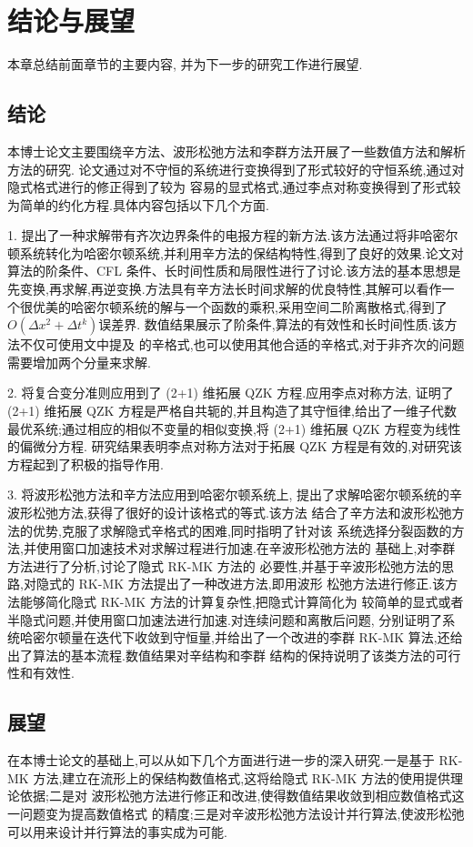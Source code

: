 \chapter{结论与展望}
本章总结前面章节的主要内容, 并为下一步的研究工作进行展望.
\section{结论}
本博士论文主要围绕辛方法、波形松弛方法和李群方法开展了一些数值方法和解析方法的研究.
论文通过对不守恒的系统进行变换得到了形式较好的守恒系统,通过对隐式格式进行的修正得到了较为
容易的显式格式,通过李点对称变换得到了形式较为简单的约化方程.具体内容包括以下几个方面.

1. 提出了一种求解带有齐次边界条件的电报方程的新方法.该方法通过将非哈密尔顿系统转化为哈密尔顿系统,并利用辛方法的保结构特性,得到了良好的效果.论文对算法的阶条件、CFL 条件、长时间性质和局限性进行了讨论.该方法的基本思想是先变换,再求解,再逆变换.方法具有辛方法长时间求解的优良特性,其解可以看作一个很优美的哈密尔顿系统的解与一个函数的乘积,采用空间二阶离散格式,得到了 \texorpdfstring{$O(\Delta x^2+ \Delta t^k)$} 的误差界.
数值结果展示了阶条件,算法的有效性和长时间性质.该方法不仅可使用文中提及
的辛格式,也可以使用其他合适的辛格式,对于非齐次的问题需要增加两个分量来求解.

2. 将复合变分准则应用到了 (2+1) 维拓展 QZK 方程.应用李点对称方法,
证明了 (2+1) 维拓展 QZK 方程是严格自共轭的,并且构造了其守恒律,给出了一维子代数
最优系统;通过相应的相似不变量的相似变换,将 (2+1) 维拓展 QZK 方程变为线性的偏微分方程.
研究结果表明李点对称方法对于拓展 QZK 方程是有效的,对研究该方程起到了积极的指导作用.

3. 将波形松弛方法和辛方法应用到哈密尔顿系统上,
提出了求解哈密尔顿系统的辛波形松弛方法,获得了很好的设计该格式的等式.该方法
结合了辛方法和波形松弛方法的优势,克服了求解隐式辛格式的困难,同时指明了针对该
系统选择分裂函数的方法,并使用窗口加速技术对求解过程进行加速.在辛波形松弛方法的
基础上,对李群方法进行了分析,讨论了隐式 RK-MK 方法的
必要性,并基于辛波形松弛方法的思路,对隐式的 RK-MK 方法提出了一种改进方法,即用波形
松弛方法进行修正.该方法能够简化隐式 RK-MK 方法的计算复杂性,把隐式计算简化为
较简单的显式或者半隐式问题,并使用窗口加速法进行加速.对连续问题和离散后问题,
分别证明了系统哈密尔顿量在迭代下收敛到守恒量,并给出了一个改进的李群 RK-MK
算法,还给出了算法的基本流程.数值结果对辛结构和李群
结构的保持说明了该类方法的可行性和有效性.

\section{展望}
在本博士论文的基础上,可以从如下几个方面进行进一步的深入研究.一是基于 RK-MK
方法,建立在流形上的保结构数值格式,这将给隐式 RK-MK 方法的使用提供理论依据;二是对
波形松弛方法进行修正和改进,使得数值结果收敛到相应数值格式这一问题变为提高数值格式
的精度;三是对辛波形松弛方法设计并行算法,使波形松弛可以用来设计并行算法的事实成为可能.
